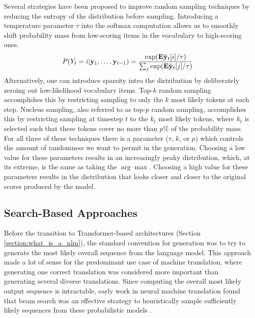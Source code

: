Several strategies have been proposed to improve random sampling techniques by reducing the entropy of the distribution before sampling.
Introducing a temperature parameter $\tau$ into the softmax computation allows us to smoothly shift probability mass from low-scoring items in the vocabulary to high-scoring ones.
\begin{align}
    \label{equation:softmax_with_temp}
    P(Y_t=i | \mathbf{y}_1, \ldots, \mathbf{y}_{t-1}) = \frac{\exp(\mathbf{E}\hat{\mathbf{y}}_t[i]/\tau)}{\sum_j\exp(\mathbf{E}\hat{\mathbf{y}}_t[j]/\tau)}
\end{align}
Alternatively, one can introduce sparsity intro the distribution by deliberately zeroing out low-likelihood vocabulary items.
Top-$k$ random sampling accomplishes this by restricting sampling to only the $k$ most likely tokens at each step.
Nucleus sampling, also referred to as top-$p$ random sampling, accomplishes this by restricting sampling at timestep $t$ to the $k_t$ most likely tokens, where $k_t$ is selected such that these tokens cover no more than $p$\% of the probability mass.
For all three of these techniques there is a parameter ($\tau$, $k$, or $p$) which controls the amount of randomness we want to permit in the generation.
Choosing a low value for these parameters results in an increasingly peaky distribution, which, at its extreme, is the same as taking the $\arg \max$. 
Choosing a high value for these parameters results in the distribution that looks closer and closer to the original scores produced by the model.

\subsection{Search-Based Approaches}
Before the transition to Transformer-based architectures (Section \ref{section:what_is_a_nlm}), the standard convention for generation was to try to generate the most likely overall sequence from the language model.
This approach made a lot of sense for the predominant use case of machine translation, where generating one correct translation was considered more important than generating several diverse translations.
Since computing the overall most likely output sequence is intractable, early work in neural machine translation found that beam search was an effective strategy to heuristically sample sufficiently likely sequences from these probabilistic models \cite{sutskever2014sequence}.


